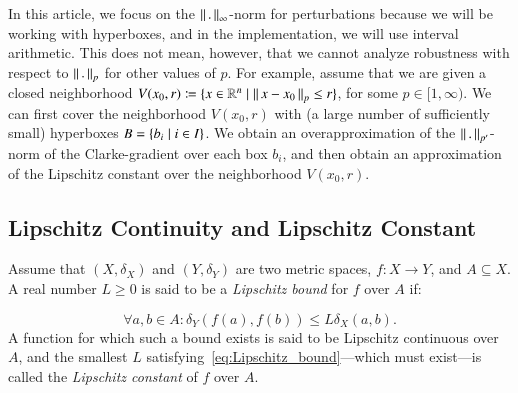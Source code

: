 \documentclass[11pt,times]{article}
\begin{document}
\begin{remark}
\label{rem:l_p_norms}
  In this article, we focus on the ${\left\lVert\thinspace {.} \thinspace \right\rVert}_{\infty}$-norm for
  perturbations because we will be working with hyperboxes, and in the
  implementation, we will use interval arithmetic. This does not mean,
  however, that we cannot analyze robustness with respect to
  ${\left\lVert\thinspace {.} \thinspace \right\rVert}_p$ for other values of $p$. For example, assume that we
  are given a closed neighborhood
  $V(x_0,r) \coloneqq \{{x \in \mathbb{R}^n} \mid { \ensuremath{{\left\lVert\thinspace {x - x_0} \thinspace \right\rVert}}_p \leq
    r}\}$, for some $p \in [1, \infty)$. We can first cover the
  neighborhood $V(x_0,r)$ with (a large number of sufficiently small)
  hyperboxes $B = \{{b_i} \mid {i \in I}\}$. We obtain an
  overapproximation of the ${\left\lVert\thinspace {.} \thinspace \right\rVert}_{p'}$-norm of the Clarke-gradient
  over each box $b_i$, and then obtain an approximation of the
  Lipschitz constant over the neighborhood $V(x_0,r)$.
\end{remark}


  

\subsection{Lipschitz Continuity and Lipschitz Constant}

Assume that $(X, \delta_X)$ and $(Y, \delta_Y)$ are two metric spaces,
$f : X \to Y$, and $A \subseteq X$. A real number $L \geq 0$ is said
to be a \emph{Lipschitz bound} for $f$ over $A$ if:

\begin{equation}
  \label{eq:Lipschitz_bound}
  \forall a, b \in A: \delta_Y(f(a), f(b)) \leq L \delta_X( a, b).  
\end{equation}
%
\noindent
A function for which such a bound exists is said to be Lipschitz
continuous over $A$, and the smallest $L$
satisfying~\eqref{eq:Lipschitz_bound}---which must exist---is called
the \emph{Lipschitz constant} of $f$ over $A$.
\end{document}
